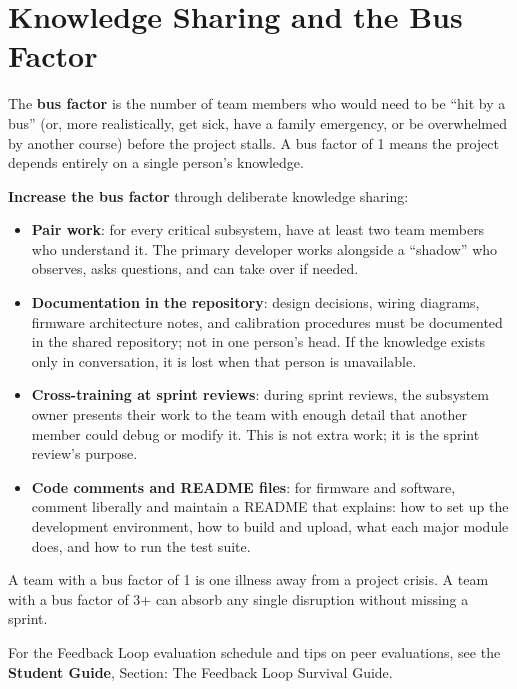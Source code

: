 \section{Knowledge Sharing and the Bus Factor}
The \textbf{bus factor} is the number of team members who would need to be ``hit by a bus'' (or, more realistically, get sick, have a family emergency, or be overwhelmed by another course) before the project stalls. A bus factor of 1 means the project depends entirely on a single person's knowledge.

\textbf{Increase the bus factor} through deliberate knowledge sharing:
\begin{itemize}[nosep,leftmargin=1.5em]
\item \textbf{Pair work}: for every critical subsystem, have at least two team members who understand it. The primary developer works alongside a ``shadow'' who observes, asks questions, and can take over if needed.
\item \textbf{Documentation in the repository}: design decisions, wiring diagrams, firmware architecture notes, and calibration procedures must be documented in the shared repository; not in one person's head. If the knowledge exists only in conversation, it is lost when that person is unavailable.
\item \textbf{Cross-training at sprint reviews}: during sprint reviews, the subsystem owner presents their work to the team with enough detail that another member could debug or modify it. This is not extra work; it is the sprint review's purpose.
\item \textbf{Code comments and README files}: for firmware and software, comment liberally and maintain a README that explains: how to set up the development environment, how to build and upload, what each major module does, and how to run the test suite.
\end{itemize}

A team with a bus factor of 1 is one illness away from a project crisis. A team with a bus factor of 3+ can absorb any single disruption without missing a sprint.


\begin{tipbox}
For the Feedback Loop evaluation schedule and tips on peer evaluations, see the \textbf{Student Guide}, Section: The Feedback Loop Survival Guide.
\end{tipbox}

